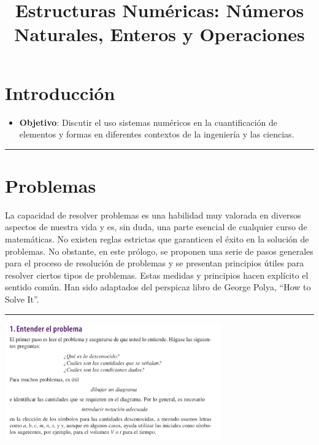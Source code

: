\documentclass[
  letterpaper,
  DIV=11,
  numbers=noendperiod]{scrartcl}
\title{Estructuras Numéricas: Números Naturales, Enteros y Operaciones}
\author{}
\date{}
\providecommand{\tightlist}{%
  \setlength{\itemsep}{0pt}\setlength{\parskip}{0pt}}\usepackage{longtable,booktabs,array}
\begin{document}
\maketitle


\section{Introducción}\label{introducciuxf3n}

\begin{itemize}
\tightlist
\item
  \textbf{Objetivo}: Discutir el uso sistemas numéricos en la
  cuantificación de elementos y formas en diferentes contextos de la
  ingeniería y las ciencias.
\end{itemize}

\begin{center}\rule{0.5\linewidth}{0.5pt}\end{center}

\section{Problemas}\label{problemas}

La capacidad de resolver problemas es una habilidad muy valorada en
diversos aspectos de nuestra vida y es, sin duda, una parte esencial de
cualquier curso de matemáticas. No existen reglas estrictas que
garanticen el éxito en la solución de problemas. No obstante, en este
prólogo, se proponen una serie de pasos generales para el proceso de
resolución de problemas y se presentan principios útiles para resolver
ciertos tipos de problemas. Estas medidas y principios hacen explícito
el sentido común. Han sido adaptados del perspicaz libro de George
Polya, ``How to Solve It''.

\begin{center}\rule{0.5\linewidth}{0.5pt}\end{center}

\includegraphics[width=0.7\textwidth,height=\textheight]{image.png}
\end{document}
